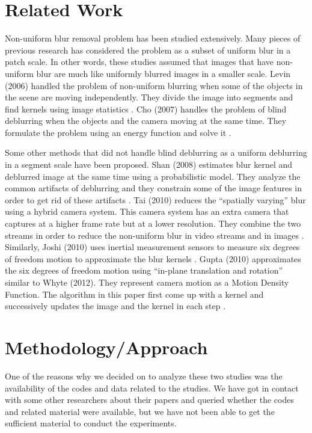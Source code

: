 \documentclass[10pt,twocolumn,letterpaper]{article}
\begin{document}
\section{Related Work}

Non-uniform blur removal problem has been studied extensively. Many pieces of previous research has considered the problem as a subset of uniform blur in a patch scale. In other words, these studies assumed that images that have non-uniform blur are much like uniformly blurred images in a smaller scale. Levin (2006) handled the problem of non-uniform blurring when some of the objects in the scene are moving independently. They divide the image into segments and find kernels using image statistics  \cite{levin2006blind}. Cho \etal (2007) handles the problem of blind deblurring when the objects and the camera moving at the same time. They formulate the problem using an energy function and solve it \cite{cho2007removing}. 

Some other methods that did not handle blind deblurring as a uniform deblurring in a segment scale have been proposed. Shan \etal (2008) estimates blur kernel and deblurred image at the same time using a probabilistic model. They analyze the common artifacts of deblurring and they constrain some of the image features in order to get rid of these artifacts \cite{shan2008high}. Tai \etal (2010) reduces the ``spatially varying'' blur using a hybrid camera system. This camera system has an extra camera that captures at a higher frame rate but at a lower resolution. They combine the two streams in order to reduce the non-uniform blur in video streams and in images \cite{tai2010correction}. Similarly, Joshi \etal (2010) uses inertial measurement sensors to measure six degrees of freedom motion to approximate the blur kernels \cite{joshi2010image}. Gupta \etal (2010) approximates the six degrees of freedom motion using ``in-plane translation and rotation'' similar to Whyte \etal (2012). They represent camera motion as a Motion Density Function. The algorithm in this paper first come up with a kernel and successively updates the image and the kernel in each step \cite{gupta2010single}.
 

\section{Methodology/Approach}

One of the reasons why we decided on to analyze these two studies was the availability of the codes and data related to the studies. We have got in contact with some other researchers about their papers and queried whether the codes and related material were available, but we have not been able to get the sufficient material to conduct the experiments.
\end{document}
